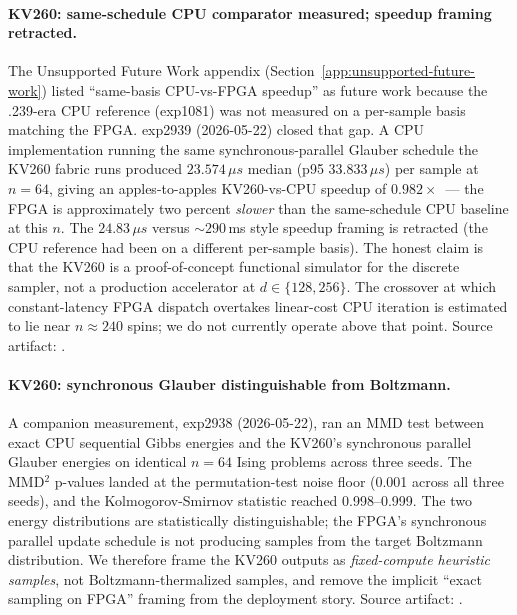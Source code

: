 \documentclass[10pt]{article}
\begin{document}
\paragraph{KV260: same-schedule CPU comparator measured; speedup framing retracted.}
The Unsupported Future Work appendix
(Section~\ref{app:unsupported-future-work}) listed
``same-basis CPU-vs-FPGA speedup'' as future work because the
.239-era CPU reference (exp1081) was not measured on a per-sample
basis matching the FPGA. exp2939 (2026-05-22) closed that gap. A CPU
implementation running the same synchronous-parallel Glauber
schedule the KV260 fabric runs produced
$23.574\,\mu s$ median (p95 $33.833\,\mu s$) per sample at $n=64$,
giving an apples-to-apples KV260-vs-CPU speedup of
$0.982\times$~--- the FPGA is approximately two percent
\emph{slower} than the same-schedule CPU baseline at this $n$. The
$24.83\,\mu s$ versus $\sim 290$\,ms style speedup framing is
retracted (the CPU reference had been on a different per-sample
basis). The honest claim is that the KV260 is a proof-of-concept
functional simulator for the discrete sampler, not a production
accelerator at $d \in \{128, 256\}$. The crossover at which
constant-latency FPGA dispatch overtakes linear-cost CPU iteration
is estimated to lie near $n \approx 240$ spins; we do not currently
operate above that point. Source artifact:
.

\paragraph{KV260: synchronous Glauber distinguishable from Boltzmann.}
A companion measurement, exp2938 (2026-05-22), ran an MMD test
between exact CPU sequential Gibbs energies and the KV260's
synchronous parallel Glauber energies on identical $n=64$ Ising
problems across three seeds. The MMD$^2$ p-values landed at the
permutation-test noise floor (0.001 across all three seeds), and
the Kolmogorov-Smirnov statistic reached 0.998--0.999. The two
energy distributions are statistically distinguishable; the FPGA's
synchronous parallel update schedule is not producing samples from
the target Boltzmann distribution. We therefore frame the KV260
outputs as \emph{fixed-compute heuristic samples}, not
Boltzmann-thermalized samples, and remove the implicit ``exact
sampling on FPGA'' framing from the deployment story. Source
artifact:
.
\end{document}
